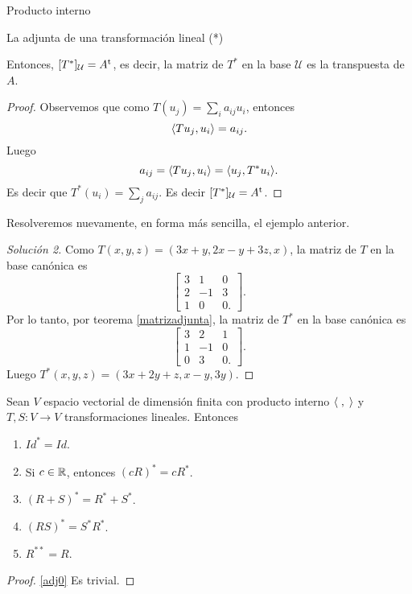 \begin{chapter}{Producto interno}
\begin{section}{La adjunta de una transformaci\'on lineal (*)}
\begin{teorema}
            Entonces, $[T^*]_{\mathcal U} = A^{\operatorname{t}}$, es decir, la matriz de $T^*$ en la base $\mathcal U$ es la transpuesta de $A$. 
        \end{teorema}
        \begin{proof}
            Observemos  que como $T(u_j) = \sum_i a_{ij}u_i$, entonces 
            $$
            \langle Tu_j,u_i\rangle = a_{ij}.
            $$
            Luego 
            $$
            a_{ij} = \langle Tu_j,u_i\rangle = \langle u_j,T^*u_i\rangle.
            $$
            Es decir  que $T^*(u_i) = \sum_j a_{ij}$. Es decir $[T^*]_{\mathcal U} = A^{\operatorname{t}}$.
        \end{proof}
        
        
    
        
        \begin{ejemplo*} Resolveremos nuevamente, en forma más sencilla, el ejemplo anterior.
        \end{ejemplo*}
        \begin{proof}[Solución 2]
            Como $T(x,y,z) = (3x +y, 2x -y+ 3z, x)$, la matriz de $T$ en la base canónica es 
            $$
            \left[\begin{matrix}
            3&1&0\\2&-1&3\\1&0&0.
            \end{matrix}
            \right].
            $$
            Por lo tanto, por teorema  \ref{matrizadjunta}, la matriz de $T^*$ en la base canónica es
            $$
            \left[\begin{matrix}
            3&2&1\\1&-1&0\\0&3&0.
            \end{matrix}
            \right].
            $$
            Luego $T^*(x,y,z) = (3x+2y+z,x-y,3y)$.
        \end{proof}

    
        
        \begin{proposicion}\label{adjprop}
            Sean $V$ espacio vectorial de dimensión finita con producto interno $\langle \;,\;\rangle$ y $T,S:V \to V$ transformaciones lineales. Entonces
            \begin{enumerate}
                \item\label{adj0} $Id^* = Id$.
                \item\label{adj1} Si $c \in \mathbb R$, entonces $(cR)^* = cR^*$.
                \item\label{adj2} $(R+S)^* = R^* + S^*$.
                \item\label{adj3} $(RS)^* = S^*R^*$.
                \item\label{adj4} $R^{**} = R$.
            \end{enumerate} 
        \end{proposicion}
        \begin{proof}
            \ref{adj0} Es trivial.
            

\end{proof}
\end{section}
\end{chapter}
